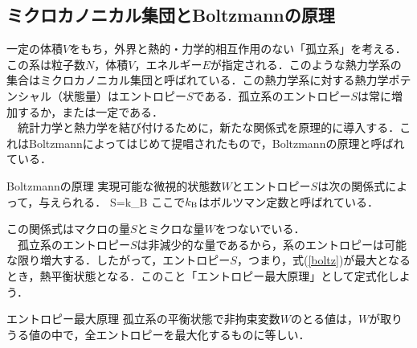 \subsection{ミクロカノニカル集団とBoltzmannの原理}
一定の体積$V$をもち，外界と熱的・力学的相互作用のない「孤立系」を考える．この系は粒子数$N$，体積$V$，エネルギー$E$が指定される．このような熱力学系の集合はミクロカノニカル集団と呼ばれている．この熱力学系に対する熱力学ポテンシャル（状態量）はエントロピー$S$である．孤立系のエントロピー$S$は常に増加するか，または一定である．\\
　統計力学と熱力学を結び付けるために，新たな関係式を原理的に導入する．これはBoltzmannによってはじめて提唱されたもので，Boltzmannの原理と呼ばれている．
%
%
\begin{itembox}[l]{Boltzmannの原理}
実現可能な微視的状態数$W$とエントロピー$S$は次の関係式によって，与えられる．
\be\label{boltz}
S=k_{{\rm B}}
\ee
ここで$k_{\rm{B}}$はボルツマン定数と呼ばれている．
\end{itembox}
この関係式はマクロの量$S$とミクロな量$W$をつないでいる．\\
　孤立系のエントロピー$S$は非減少的な量であるから，系のエントロピーは可能な限り増大する．したがって，エントロピー$S$，つまり，式(\ref{boltz})が最大となるとき，熱平衡状態となる．このこと「エントロピー最大原理」として定式化しよう．
%
\begin{itembox}[l]{エントロピー最大原理}
孤立系の平衡状態で非拘束変数$W$のとる値は，$W$が取りうる値の中で，全エントロピーを最大化するものに等しい．
\end{itembox}





%
